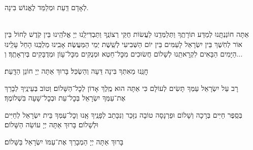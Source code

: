 \documentclass[twoside, openany, parskip=half, 11pt]{book}
\begin{document}
\amidaopening{\ayt}{}

לְאָדָם דַּֽעַת וּמְלַמֵּד לֶאֱנוֹשׁ בִּינָה.

\begin{sometimes}

\\
אַתָּה חוֹנַנְתָּֽנוּ לְמַדַּע תּוֹרָתֶֽךָ וַתְּלַמְּדֵֽנוּ לַעֲשׂוֹת חֻקֵּי רְצוֹנֶֽךָ וַתַּבְדִּילֵֽנוּ יְיָ אֱלֹהֵֽינוּ בֵּין קֹֽדֶשׁ לְחוֹל בֵּין אוֹר לְחֹֽשֶׁךְ בֵּין יִשְׂרָאֵל לָעַמִּים בֵּין יוֹם הַשְּׁבִיעִי לְשֵֽׁשֶׁת יְמֵי הַמַּעֲשֶׂה׃ אָבִֽינוּ מַלְכֵּֽנוּ הָחֵל עָלֵֽינוּ הַיָּמִים הַבָּאִים לִקְרָאתֵֽנוּ לְשָׁלוֹם חֲשׂוּכִים מִכׇּל־חֵטְא וּמְנֻקִּים מִכׇּל־עָוֹן וּמְדֻבָּקִים בְּיִרְאָתֶֽךָ׃ וְ...

\end{sometimes}

חׇנֵּֽנוּ מֵאִתְּךָ בִּינָה דֵּעָה וְהַשְׂכֵּל׃ בָּרוּךְ אַתָּה יְיָ חוֹנֵן הַדָּֽעַת׃

\weekdaysateshuva

\weekdaysaselichah

\weekdaysageulah

\weekdaysarefuah

\weekdaysaberacha

\weekdaysashofar

\weekdaysamishpat

\weekdaysaminim

\weekdaysatzadikim

\weekdaysayerushelayim

\weekdaysamalchus

\weekdaysashemakoleinu

\retzeh

\yaalehveyavo

\zion

\maarivmodim

\alhanisim

\weekdaysahodos

רָב עַל יִשְׂרָאֵל עַמְּךָ תָּשִׂים לְעוֹלָם כִּי אַתָּה הוּא מֶֽלֶךְ אָדוֹן לְכׇל־הַשָּׁלוֹם׃ וְטוֹב בְּעֵינֶֽיךָ לְבָרֵךְ אֶת־עַמְּךָ יִשְׂרָאֵל בְּכׇל־עֵת וּבְכׇל־שָׁעָה בִּשְׁלוֹמֶךָ׃
\vspace{-0.4\baselineskip}
\begin{paracol}{2}

\begin{small}
בְּסֵֽפֶר חַיִּים בְּרָכָה וְשָׁלוֹם וּפַרְנָסָה טוֹבָה נִזָּכֵר וְנִכָּתֵב לְפָנֶֽיךָ אָֽנוּ וְכׇל־עַמְּךָ בֵּית יִשְׂרָאֵל לְחַיִּים וּלְשָׁלוֹם׃ בָּרוּךְ אַתָּה יְיָ עוֹשֵׂה הַשָּׁלוֹם׃

\end{small}
\switchcolumn
בָּרוּךְ אַתָּה יְיָ הַמְבָרֵךְ אֶת־עַמּוֹ יִשְׂרָאֵל בַּשָּׁלוֹם׃

\end{paracol}
\end{document}
